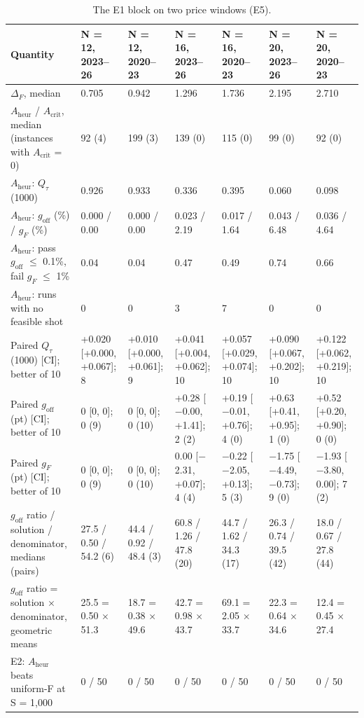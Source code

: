\documentclass[journal]{IEEEtran}
\begin{document}
\begin{table}[!t]
\centering
\scriptsize
\caption{The E1 block on two price windows (E5).}
\label{tab:S15}
\begin{tabular}{p{}p{}p{}p{}p{}p{}p{}}
\toprule
Quantity & N = 12, 2023--26 & N = 12, 2020--23 & N = 16, 2023--26 & N = 16, 2020--23 & N = 20, 2023--26 & N = 20, 2020--23 \\
\midrule
$\Delta_{F}$, median & 0.705 & 0.942 & 1.296 & 1.736 & 2.195 & 2.710 \\
$A_{\mathrm{heur}}$ / $A_{\mathrm{crit}}$, median (instances with $A_{\mathrm{crit}}$ = 0) & 92 (4) & 199 (3) & 139 (0) & 115 (0) & 99 (0) & 92 (0) \\
$A_{\mathrm{heur}}$: $Q_{\tau}$(1000) & 0.926 & 0.933 & 0.336 & 0.395 & 0.060 & 0.098 \\
$A_{\mathrm{heur}}$: $g_{\mathrm{off}}$ (\%) / $g_{F}$ (\%) & 0.000 / 0.00 & 0.000 / 0.00 & 0.023 / 2.19 & 0.017 / 1.64 & 0.043 / 6.48 & 0.036 / 4.64 \\
$A_{\mathrm{heur}}$: pass $g_{\mathrm{off}}$ $\leq$ 0.1\%, fail $g_{F}$ $\leq$ 1\% & 0.04 & 0.04 & 0.47 & 0.49 & 0.74 & 0.66 \\
$A_{\mathrm{heur}}$: runs with no feasible shot & 0 & 0 & 3 & 7 & 0 & 0 \\
Paired $Q_{\tau}$(1000) [CI]; better of 10 & +0.020 [+0.000, +0.067]; 8 & +0.010 [+0.000, +0.061]; 9 & +0.041 [+0.004, +0.062]; 10 & +0.057 [+0.029, +0.074]; 10 & +0.090 [+0.067, +0.202]; 10 & +0.122 [+0.062, +0.219]; 10 \\
Paired $g_{\mathrm{off}}$ (pt) [CI]; better of 10 & 0 [0, 0]; 0 (9) & 0 [0, 0]; 0 (10) & +0.28 [$-$0.00, +1.41]; 2 (2) & +0.19 [$-$0.01, +0.76]; 4 (0) & +0.63 [+0.41, +0.95]; 1 (0) & +0.52 [+0.20, +0.90]; 0 (0) \\
Paired $g_{F}$ (pt) [CI]; better of 10 & 0 [0, 0]; 0 (9) & 0 [0, 0]; 0 (10) & 0.00 [$-$2.31, +0.07]; 4 (4) & $-$0.22 [$-$2.05, +0.13]; 5 (3) & $-$1.75 [$-$4.49, $-$0.73]; 9 (0) & $-$1.93 [$-$3.80, 0.00]; 7 (2) \\
$g_{\mathrm{off}}$ ratio / solution / denominator, medians (pairs) & 27.5 / 0.50 / 54.2 (6) & 44.4 / 0.92 / 48.4 (3) & 60.8 / 1.26 / 47.8 (20) & 44.7 / 1.62 / 34.3 (17) & 26.3 / 0.74 / 39.5 (42) & 18.0 / 0.67 / 27.8 (44) \\
$g_{\mathrm{off}}$ ratio = solution $\times$ denominator, geometric means & 25.5 = 0.50 $\times$ 51.3 & 18.7 = 0.38 $\times$ 49.6 & 42.7 = 0.98 $\times$ 43.7 & 69.1 = 2.05 $\times$ 33.7 & 22.3 = 0.64 $\times$ 34.6 & 12.4 = 0.45 $\times$ 27.4 \\
E2: $A_{\mathrm{heur}}$ beats uniform-F at S = 1,000 & 0 / 50 & 0 / 50 & 0 / 50 & 0 / 50 & 0 / 50 & 0 / 50 \\
\bottomrule
\end{tabular}
\end{table}
\end{document}
